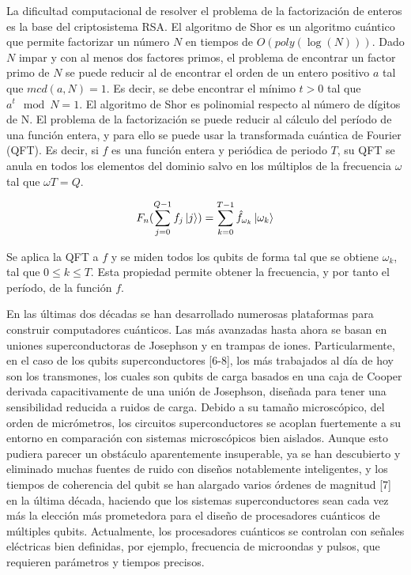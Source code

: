 La dificultad computacional de resolver el problema de la factorización de enteros es la base del criptosistema RSA. El algoritmo de Shor es un algoritmo cuántico que permite factorizar un número $N$ en tiempos de $O(poly(\log (N)))$. Dado $N$ impar y con al menos dos factores primos, el problema de encontrar un factor primo de $N$ se puede reducir al de encontrar el orden de un entero positivo $a$ tal que $mcd(a, N) = 1$. Es decir, se debe encontrar el mínimo $t > 0$ tal que $a^t \mod N = 1$. El algoritmo de Shor es polinomial respecto al número de dígitos de N. El problema de la factorización se puede reducir al cálculo del período de una función entera, y para ello se puede usar la transformada cuántica de Fourier (QFT). Es decir, si $f$ es una función entera y periódica de periodo $T$, su QFT se anula en todos los elementos del dominio salvo en los múltiplos de la frecuencia $\omega$ tal que $\omega T = Q$.

\begin{equation}
    F_n (\sum_{j=0}^{Q-1} f_j \ket{j}) = \sum_{k=0}^{T-1} \hat{f}_{\omega_k} \ket{\omega_k}
\end{equation}

Se aplica la QFT a $f$ y se miden todos los qubits de forma tal que se obtiene $\omega_k$, tal que $0 \leq k \leq T$. Esta propiedad permite obtener la frecuencia, y por tanto el período, de la función $f$.

En las últimas dos décadas se han desarrollado numerosas plataformas para construir computadores cuánticos. Las más avanzadas hasta ahora se basan en uniones superconductoras de Josephson y en trampas de iones. Particularmente, en el caso de los qubits superconductores [6-8], los más trabajados al día de hoy son los transmones, los cuales son qubits de carga basados en una caja de Cooper derivada capacitivamente de una unión de Josephson, diseñada para tener una sensibilidad reducida a ruidos de carga. Debido a su tamaño microscópico, del orden de micrómetros, los circuitos superconductores se acoplan fuertemente a su entorno en comparación con sistemas microscópicos bien aislados. Aunque esto pudiera parecer un obstáculo aparentemente insuperable, ya se han descubierto y eliminado muchas fuentes de ruido con diseños notablemente inteligentes, y los tiempos de coherencia del qubit se han alargado varios órdenes de magnitud [7] en la última década, haciendo que los sistemas superconductores sean cada vez más la elección más prometedora para el diseño de procesadores cuánticos de múltiples qubits. Actualmente, los procesadores cuánticos se controlan con señales eléctricas bien definidas, por ejemplo, frecuencia de microondas y pulsos, que requieren parámetros y tiempos precisos.

